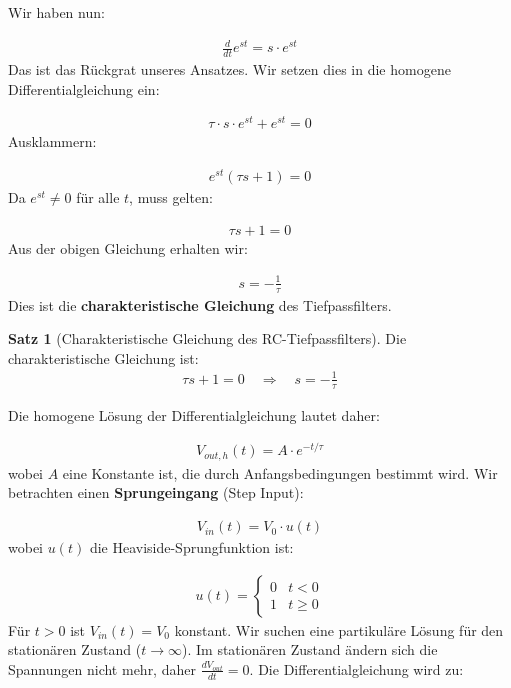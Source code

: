 \documentclass[a4paper,12pt,twoside]{report}
\theoremstyle{definition}
\newtheorem{satz}{Satz}
\begin{document}
Wir haben nun:

\begin{align}
	\frac{d}{dt} e^{st} = s \cdot e^{st}
\end{align}
Das ist das Rückgrat unseres Ansatzes. Wir setzen dies in die homogene Differentialgleichung ein:

\begin{align}
	\tau \cdot s \cdot e^{st} + e^{st} = 0
\end{align}
Ausklammern:

\begin{align}
	e^{st} (\tau s + 1) = 0
\end{align}
Da $e^{st} \neq 0$ für alle $t$, muss gelten:

\begin{align}
	\tau s + 1 = 0
\end{align}
Aus der obigen Gleichung erhalten wir:

\begin{align}
	s = -\frac{1}{\tau}
\end{align}
Dies ist die \textbf{charakteristische Gleichung} des Tiefpassfilters.

\begin{satz}[Charakteristische Gleichung des RC-Tiefpassfilters]
	Die charakteristische Gleichung ist:
	\begin{align}
		\tau s + 1 = 0 \quad \Rightarrow \quad s = -\frac{1}{\tau}
	\end{align}
\end{satz}
Die homogene Lösung der Differentialgleichung lautet daher:

\begin{align}
	V_{out,h}(t) = A \cdot e^{-t/\tau}
\end{align}
wobei $A$ eine Konstante ist, die durch Anfangsbedingungen bestimmt wird. Wir betrachten einen \textbf{Sprungeingang} (Step Input):

\begin{align}
	V_{in}(t) = V_0 \cdot u(t)
\end{align}
wobei $u(t)$ die Heaviside-Sprungfunktion ist:

\begin{align}
	u(t) = \begin{cases} 0 & t < 0 \\ 1 & t \geq 0 \end{cases}
\end{align}
Für $t > 0$ ist $V_{in}(t) = V_0$ konstant. Wir suchen eine partikuläre Lösung für den stationären Zustand ($t \to \infty$). 
Im stationären Zustand ändern sich die Spannungen nicht mehr, daher $\frac{dV_{out}}{dt} = 0$. Die Differentialgleichung wird zu:
\end{document}

